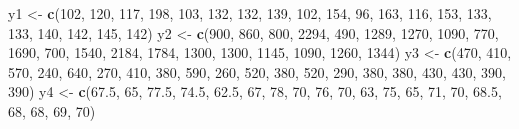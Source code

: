 \documentclass[
]{book}
\newenvironment{Shaded}{\begin{snugshade}}{\end{snugshade}}
\newcommand{\DecValTok}[1]{\textcolor[rgb]{0.00,0.00,0.81}{#1}}
\newcommand{\FloatTok}[1]{\textcolor[rgb]{0.00,0.00,0.81}{#1}}
\newcommand{\FunctionTok}[1]{\textcolor[rgb]{0.13,0.29,0.53}{\textbf{#1}}}
\newcommand{\NormalTok}[1]{#1}
\newcommand{\OtherTok}[1]{\textcolor[rgb]{0.56,0.35,0.01}{#1}}
\begin{document}
\begin{Shaded}
\begin{Highlighting}[]
\NormalTok{y1 }\OtherTok{\textless{}{-}} \FunctionTok{c}\NormalTok{(}\DecValTok{102}\NormalTok{, }\DecValTok{120}\NormalTok{, }\DecValTok{117}\NormalTok{, }\DecValTok{198}\NormalTok{, }\DecValTok{103}\NormalTok{, }\DecValTok{132}\NormalTok{, }\DecValTok{132}\NormalTok{, }\DecValTok{139}\NormalTok{, }\DecValTok{102}\NormalTok{, }\DecValTok{154}\NormalTok{, }\DecValTok{96}\NormalTok{, }\DecValTok{163}\NormalTok{, }\DecValTok{116}\NormalTok{, }\DecValTok{153}\NormalTok{, }\DecValTok{133}\NormalTok{, }\DecValTok{133}\NormalTok{, }\DecValTok{140}\NormalTok{, }\DecValTok{142}\NormalTok{, }\DecValTok{145}\NormalTok{, }\DecValTok{142}\NormalTok{)}
\NormalTok{y2 }\OtherTok{\textless{}{-}} \FunctionTok{c}\NormalTok{(}\DecValTok{900}\NormalTok{, }\DecValTok{860}\NormalTok{, }\DecValTok{800}\NormalTok{, }\DecValTok{2294}\NormalTok{, }\DecValTok{490}\NormalTok{, }\DecValTok{1289}\NormalTok{, }\DecValTok{1270}\NormalTok{, }\DecValTok{1090}\NormalTok{, }\DecValTok{770}\NormalTok{, }\DecValTok{1690}\NormalTok{, }\DecValTok{700}\NormalTok{, }\DecValTok{1540}\NormalTok{, }\DecValTok{2184}\NormalTok{, }\DecValTok{1784}\NormalTok{, }\DecValTok{1300}\NormalTok{, }\DecValTok{1300}\NormalTok{, }\DecValTok{1145}\NormalTok{, }\DecValTok{1090}\NormalTok{, }\DecValTok{1260}\NormalTok{, }\DecValTok{1344}\NormalTok{)}
\NormalTok{y3 }\OtherTok{\textless{}{-}} \FunctionTok{c}\NormalTok{(}\DecValTok{470}\NormalTok{, }\DecValTok{410}\NormalTok{, }\DecValTok{570}\NormalTok{, }\DecValTok{240}\NormalTok{, }\DecValTok{640}\NormalTok{, }\DecValTok{270}\NormalTok{, }\DecValTok{410}\NormalTok{, }\DecValTok{380}\NormalTok{, }\DecValTok{590}\NormalTok{, }\DecValTok{260}\NormalTok{, }\DecValTok{520}\NormalTok{, }\DecValTok{380}\NormalTok{, }\DecValTok{520}\NormalTok{, }\DecValTok{290}\NormalTok{, }\DecValTok{380}\NormalTok{, }\DecValTok{380}\NormalTok{, }\DecValTok{430}\NormalTok{, }\DecValTok{430}\NormalTok{, }\DecValTok{390}\NormalTok{, }\DecValTok{390}\NormalTok{)}
\NormalTok{y4 }\OtherTok{\textless{}{-}} \FunctionTok{c}\NormalTok{(}\FloatTok{67.5}\NormalTok{, }\DecValTok{65}\NormalTok{, }\FloatTok{77.5}\NormalTok{, }\FloatTok{74.5}\NormalTok{, }\FloatTok{62.5}\NormalTok{, }\DecValTok{67}\NormalTok{, }\DecValTok{78}\NormalTok{, }\DecValTok{70}\NormalTok{, }\DecValTok{76}\NormalTok{, }\DecValTok{70}\NormalTok{, }\DecValTok{63}\NormalTok{, }\DecValTok{75}\NormalTok{, }\DecValTok{65}\NormalTok{, }\DecValTok{71}\NormalTok{, }\DecValTok{70}\NormalTok{, }\FloatTok{68.5}\NormalTok{, }\DecValTok{68}\NormalTok{, }\DecValTok{68}\NormalTok{, }\DecValTok{69}\NormalTok{, }\DecValTok{70}\NormalTok{)}
\end{Highlighting}
\end{Shaded}
\end{document}
